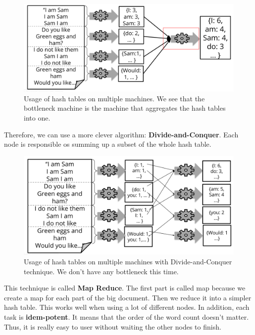 \begin{figure}[H]%
 \centering
 \includegraphics[width=13cm]{./img/10/hash-table}
 \caption{\label{pic:hash-table} Usage of hash tables on multiple machines. We see that the bottleneck machine is the machine that aggregates the hash tables into one.}
\end{figure}

Therefore, we can use a more clever algorithm: {\bf Divide-and-Conquer}. Each node is responsible os summing up a subset of the whole hash table. 

\begin{figure}[H]%
 \centering
 \includegraphics[width=13cm]{./img/10/divide-and-conquer}
 \caption{\label{pic:divide-and-conquer} Usage of hash tables on multiple machines with Divide-and-Conquer technique. We don't have any bottleneck this time.}
\end{figure}

This technique is called {\bf Map Reduce}. The first part is called map because we create a map for each part of the big document. Then we reduce it into a simpler hash table. This works well when using a lot of different nodes. In addition, each task is {\bf idem-potent}. It means that the order of the word count doesn't matter. Thus, it is really easy to user without waiting the other nodes to finish.

